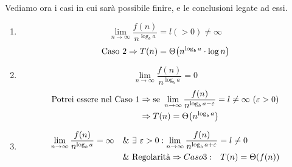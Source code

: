 Vediamo ora i casi in cui sarà possibile finire, e le conclusioni legate ad essi.
\begin{enumerate}[label=\Alph*)]
    \item $$\lim_{n \to \infty} \frac{f(n)}{n^{\log_b a}} = l (> 0) \neq \infty$$
    $$\text{\emph{Caso 2}} \Rightarrow T(n) = \Theta \big( n^{\log_b a} \cdot \log n \big)$$

    \item $$\lim_{n \to \infty} \frac{f(n)}{n^{\log_b a}} = 0 $$
    \begin{align*}
        \text{Potrei essere nel \emph{Caso 1}} & \Rightarrow \text{se } \lim_{n \to \infty} \frac{f(n)}{n^{\log_b a - \varepsilon}} = l \neq \infty \ (\varepsilon > 0) \\
        & \Rightarrow T(n) = \Theta \big( n^{\log_b a} \big)
    \end{align*}
    \item 
    \begin{align*}
    \lim_{n \to \infty} \frac{f(n)}{n^{\log_b a}} = \infty \quad & \& \ \exists \varepsilon > 0 : 
    \lim_{n \to \infty} \frac{f(n)}{n^{\log_b a + \varepsilon}} = l \neq 0 \\
    & \& \ \text{\emph{Regolarità}} \Rightarrow \emph{Caso 3:} \quad T(n) = \Theta (f(n))
    \end{align*}

\end{enumerate}


